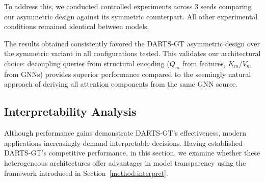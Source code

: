 \documentclass[lettersize,journal]{IEEEtran}
\begin{document}
To address this, we conducted controlled experiments across 3 seeds comparing our asymmetric design against its symmetric counterpart.  All other experimental conditions remained identical between models.

The results obtained consistently favored the DARTS-GT asymmetric design over the symmetric variant in all configurations tested. This validates our architectural choice: decoupling queries from structural encoding ($Q_{m}$ from features, $K_{m}$/$V_{m}$ from GNNs) provides superior performance compared to the seemingly natural approach of deriving all attention components from the same GNN source. 

\begin{table}[!h]
\centering
\caption{Ablation Study: Symmetric ($Q_{m}$ ,$K_{m}$ and $V_{m}$)  vs Asymmetric Attention Design (DARTS-GT design ).Shown is the mean ± std across 3 seeds. Best performance is \textbf{bolded}. }
\label{tab:symmetric_vs_asymmetric}
\vspace{-2mm}
\end{table}


\subsection{Interpretability Analysis}
\label{subsection:Interpretability1}

Although performance gains demonstrate DARTS-GT's effectiveness, modern applications increasingly demand interpretable decisions. Having established DARTS-GT's competitive performance, in this section, we examine whether these heterogeneous architectures offer advantages in model transparency using the framework introduced in Section~\ref{method:interpret}.
\end{document}
